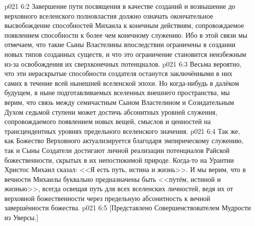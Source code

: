 \vs p021 6:2 Завершение пути посвящения в качестве созданий и возвышение до верховного вселенского полновластия должно означать окончательное высвобождение способностей Михаила к конечным действиям, сопровождаемое появлением способности к более чем конечному служению. Ибо в этой связи мы отмечаем, что такие Сыны Властелины впоследствии ограничены в создании новых типов созданных существ, и что это ограничение становится неизбежным из\hyp{}за освобождения их сверхконечных потенциалов.
\vs p021 6:3 Весьма вероятно, что эти нераскрытые способности создателя останутся заключёнными в них самих в течение всей нынешней вселенской эпохи. Но когда\hyp{}нибудь в далёком будущем, в ныне подготавливаемых вселенных внешнего пространства, мы верим, что связь между семичастным Сыном Властелином и Созидательным Духом седьмой ступени может достичь абсонитных уровней служения, сопровождаемого появлением новых вещей, смыслов и ценностей на трансцендентных уровнях предельного вселенского значения.
\vs p021 6:4 Так же, как Божество Верховного актуализируется благодаря эмпирическому служению, так и Сыны Создатели достигают личной реализации потенциалов Райской божественности, скрытых в их непостижимой природе. Когда\hyp{}то на Урантии Христос Михаил сказал: <<Я есть путь, истина и жизнь>>. И мы верим, что в вечности Михаилы буквально предназначены быть <<путём, истиной и жизнью>>, всегда освещая путь для всех вселенских личностей, ведя их от верховной божественности через предельную абсонитность к вечной завершённости божества.
\vsetoff
\vs p021 6:5 [Представлено Совершенствователем Мудрости из Уверсы.]
\quizlink
